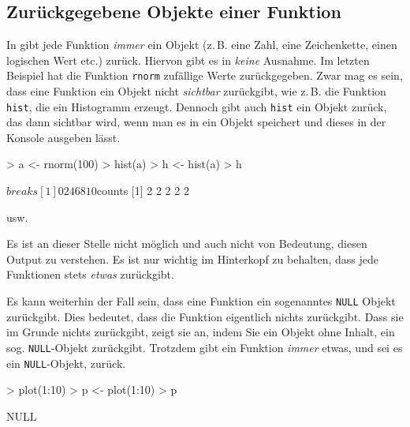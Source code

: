     

\subsection{Zurückgegebene Objekte einer Funktion}                            

In \R{} gibt jede Funktion \emph{immer} ein Objekt (z.\,B. eine Zahl, eine Zeichenkette, einen logischen Wert etc.) zurück. Hiervon gibt es in \R{} \emph{keine} Ausnahme. Im letzten Beispiel hat die Funktion \texttt{rnorm} zufällige Werte zurückgegeben. Zwar mag es sein, dass eine Funktion ein Objekt nicht \emph{sichtbar} zurückgibt, wie z.\,B. die Funktion \verb!hist!, die ein Histogramm erzeugt. Dennoch gibt auch \verb!hist! ein Objekt zurück, das dann sichtbar wird, wenn man es in ein Objekt speichert und dieses in der Konsole ausgeben lässt.

\begin{Schunk}
\begin{Sinput}
> a <- rnorm(100)
> hist(a)
> h <- hist(a)
> h
\end{Sinput}
\end{Schunk}
\vspace{-5mm}
\begin{Schunk}
\begin{Soutput}
$breaks
[1]  0  2  4  6  8 10

$counts
[1] 2 2 2 2 2
   
usw.  
\end{Soutput} 
\end{Schunk}

Es ist an dieser Stelle nicht möglich und auch nicht von Bedeutung, diesen Output zu verstehen. Es ist nur wichtig im Hinterkopf zu behalten, dass jede Funktionen stets \emph{etwas} zurückgibt.

Es kann weiterhin der Fall sein, dass eine Funktion ein sogenanntes \verb!NULL! Objekt zurückgibt. Dies bedeutet, dass die Funktion eigentlich nichts zurückgibt. Dass sie im Grunde nichts zurückgibt, zeigt sie an, indem Sie ein Objekt ohne Inhalt, ein sog. \verb!NULL!-Objekt zurückgibt. Trotzdem gibt ein Funktion \emph{immer} etwas, und sei es ein \verb!NULL!-Objekt, zurück.

\begin{Schunk}
\begin{Sinput}
> plot(1:10)
> p <- plot(1:10) 
> p
\end{Sinput}
\end{Schunk}

\vspace{-5mm}
\begin{Schunk}
\begin{Soutput}
NULL 
\end{Soutput} 
\end{Schunk}
  
